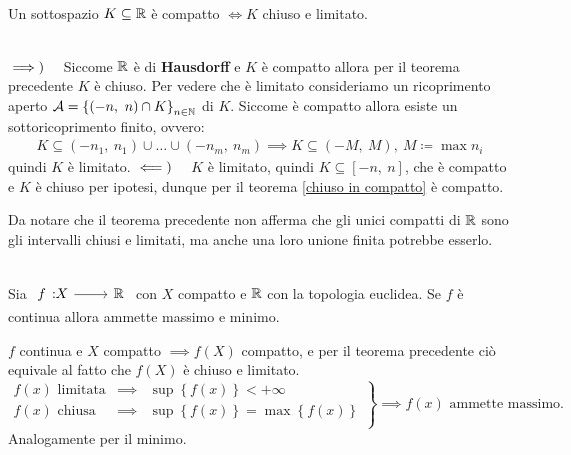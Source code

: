 \begin{theorema}~{}\label{compatto chiuso e limitato R}\\
Un sottospazio $K\subseteq \mathbb{R}$ è compatto $\iff K$ chiuso e limitato.
\end{theorema}
\begin{demonstration}~{}\\
	$\implies)\quad$ Siccome $\mathbb{R}$ è di \textbf{Hausdorff} e $K$ è compatto allora per il teorema precedente $K$ è chiuso.\newline
	Per vedere che è limitato consideriamo un ricoprimento aperto $\mathcal{A}=\left\{ (-n,\ n)\cap K\right\}_{n\in\mathbb{N}}$ di $K$. Siccome è compatto allora esiste un sottoricoprimento finito, ovvero:
	\begin{gather*}
		K\subseteq (-n_1,\ n_1)\cup\dots\cup(-n_m,\ n_m) \implies K\subseteq (-M,\ M), \ M\coloneqq \max n_i
	\end{gather*}
	quindi $K$ è limitato. \newline
	$\impliedby)\quad $ $K$ è limitato, quindi $K\subseteq [-n, \ n]$, che è compatto e $K$ è chiuso per ipotesi, dunque per il teorema \ref{chiuso in compatto} è compatto.
\end{demonstration}
\begin{observe}
	Da notare che il teorema precedente non afferma che gli unici compatti di $\mathbb{R}$ sono gli intervalli chiusi e limitati, ma anche una loro unione finita potrebbe esserlo.
\end{observe}

\begin{theorema}~{}\label{weierstrass}\\
Sia $\funz f X \realset$ con $X$ compatto e $\mathbb{R}$ con la topologia euclidea. Se $f$ è continua allora ammette massimo e minimo.
\end{theorema}
\begin{demonstration}
	$f$ continua e $X$ compatto $\implies f(X)$ compatto, e per il teorema precedente ciò equivale al fatto che $f(X)$ è chiuso e limitato.
	\begin{equation*}
		\left.
		\begin{array}{lcl}
			f\left(x\right)\text{ limitata}&\implies& \sup \left\{f\left(x\right)\right\}<+\infty\\
			f\left(x\right)\text{ chiusa}&\implies& \sup \left\{f\left(x\right)\right\}=\max \left\{f\left(x\right)\right\}\\
		\end{array}
		\right\}
		\implies f\left(x\right)\text{ ammette massimo.}
	\end{equation*}
	Analogamente per il minimo.
\end{demonstration}


